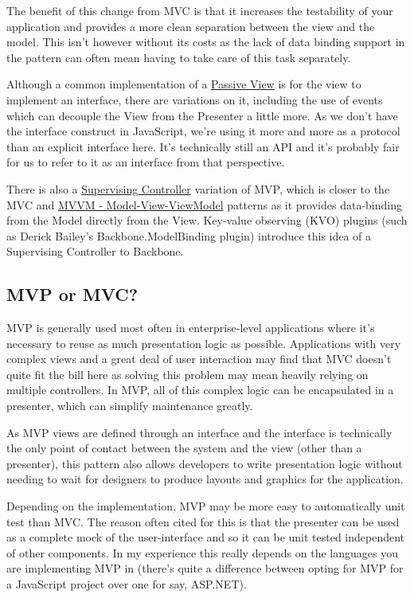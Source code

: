 \documentclass[9pt]{book}
\begin{document}
The benefit of this change from MVC is that it increases the testability
of your application and provides a more clean separation between the
view and the model. This isn't however without its costs as the lack of
data binding support in the pattern can often mean having to take care
of this task separately.

Although a common implementation of a
\href{http://martinfowler.com/eaaDev/PassiveScreen.html}{Passive View}
is for the view to implement an interface, there are variations on it,
including the use of events which can decouple the View from the
Presenter a little more. As we don't have the interface construct in
JavaScript, we're using it more and more as a protocol than an explicit
interface here. It's technically still an API and it's probably fair for
us to refer to it as an interface from that perspective.

There is also a
\href{http://martinfowler.com/eaaDev/SupervisingPresenter.html}{Supervising
Controller} variation of MVP, which is closer to the MVC and
\href{http://en.wikipedia.org/wiki/Model_View_ViewModel}{MVVM -
Model-View-ViewModel} patterns as it provides data-binding from the
Model directly from the View. Key-value observing (KVO) plugins (such as
Derick Bailey's Backbone.ModelBinding plugin) introduce this idea of a
Supervising Controller to Backbone.

\subsection{MVP or MVC?}\label{mvp-or-mvc}

MVP is generally used most often in enterprise-level applications where
it's necessary to reuse as much presentation logic as possible.
Applications with very complex views and a great deal of user
interaction may find that MVC doesn't quite fit the bill here as solving
this problem may mean heavily relying on multiple controllers. In MVP,
all of this complex logic can be encapsulated in a presenter, which can
simplify maintenance greatly.

As MVP views are defined through an interface and the interface is
technically the only point of contact between the system and the view
(other than a presenter), this pattern also allows developers to write
presentation logic without needing to wait for designers to produce
layouts and graphics for the application.

Depending on the implementation, MVP may be more easy to automatically
unit test than MVC. The reason often cited for this is that the
presenter can be used as a complete mock of the user-interface and so it
can be unit tested independent of other components. In my experience
this really depends on the languages you are implementing MVP in
(there's quite a difference between opting for MVP for a JavaScript
project over one for say, ASP.NET).
\end{document}
